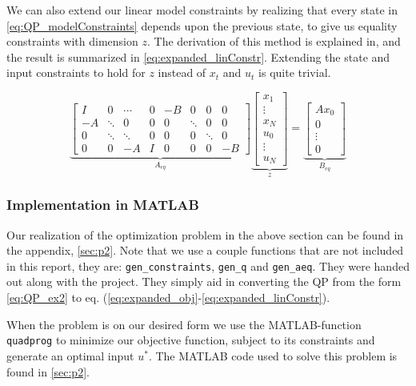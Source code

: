 We can also extend our linear model constraints by realizing that every state in \cref{eq:QP_modelConstraints} depends upon the previous state, to give us equality constraints with dimension $z$. The derivation of this method is explained in\cite{MergingOptCtr}, and the result is summarized in \cref{eq:expanded_linConstr}. Extending the state and input constraints to hold for $z$ instead of $x_t$ and $u_t$ is quite trivial.

\begin{equation}\label{eq:expanded_linConstr}
    \underbrace{\begin{bmatrix}
        I & 0 & \cdots & 0 & -B & 0 & 0 & 0 \\
        -A & \ddots & 0 & 0 & 0 & \ddots & 0 & 0 \\
        0 & \ddots & \ddots & 0 & 0 & 0 & \ddots & 0 \\
        0 & 0 & -A & I & 0 & 0 & 0 & -B
    \end{bmatrix}}_{A_{eq}}
    \underbrace{\begin{bmatrix}
        x_1 \\
        \vdots \\
        x_N \\
        u_0 \\
        \vdots \\
        u_N
    \end{bmatrix}}_z
    = 
    \underbrace{\begin{bmatrix}
        Ax_0 \\
        0 \\
        \vdots \\
        0
    \end{bmatrix}}_{B_{eq}}
\end{equation}

\subsubsection{Implementation in MATLAB}
Our realization of the optimization problem in the above section can be found in the appendix, \cref{sec:p2}. Note that we use a couple functions that are not included in this report, they are: \texttt{gen\_constraints}, \texttt{gen\_q} and \texttt{gen\_aeq}. They were handed out along with the project. They simply aid in converting the QP from the form \cref{eq:QP_ex2} to eq. (\ref{eq:expanded_obj}-\ref{eq:expanded_linConstr}).

When the problem is on our desired form we use the MATLAB-function \texttt{quadprog} to minimize our objective function, subject to its constraints and generate an optimal input $u^*$. The MATLAB code used to solve this problem is found in \cref{sec:p2}.

